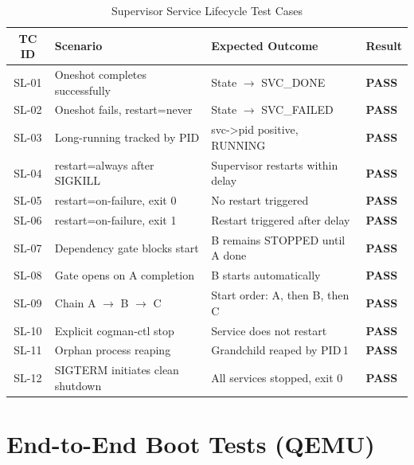 \documentclass[12pt,a4paper]{report}
\begin{document}
\begin{table}[H]
\centering
\caption{Supervisor Service Lifecycle Test Cases}
\renewcommand{\arraystretch}{1.2}
\begin{tabularx}{\linewidth}{c X X >{\centering\arraybackslash}p{1.2cm}}
\toprule
\textbf{TC ID} & \textbf{Scenario} & \textbf{Expected Outcome} & \textbf{Result}\\
\midrule
SL-01 & Oneshot completes successfully      & State $\to$ SVC\_DONE                 & \textbf{PASS}\\
SL-02 & Oneshot fails, restart=never        & State $\to$ SVC\_FAILED               & \textbf{PASS}\\
SL-03 & Long-running tracked by PID         & svc->pid positive, RUNNING            & \textbf{PASS}\\
SL-04 & restart=always after SIGKILL        & Supervisor restarts within delay      & \textbf{PASS}\\
SL-05 & restart=on-failure, exit 0          & No restart triggered                  & \textbf{PASS}\\
SL-06 & restart=on-failure, exit 1          & Restart triggered after delay         & \textbf{PASS}\\
SL-07 & Dependency gate blocks start        & B remains STOPPED until A done        & \textbf{PASS}\\
SL-08 & Gate opens on A completion          & B starts automatically                & \textbf{PASS}\\
SL-09 & Chain A $\to$ B $\to$ C    & Start order: A, then B, then C        & \textbf{PASS}\\
SL-10 & Explicit cogman-ctl stop            & Service does not restart              & \textbf{PASS}\\
SL-11 & Orphan process reaping              & Grandchild reaped by PID\,1           & \textbf{PASS}\\
SL-12 & SIGTERM initiates clean shutdown    & All services stopped, exit 0          & \textbf{PASS}\\
\bottomrule
\end{tabularx}
\end{table}

\FloatBarrier
\section{End-to-End Boot Tests (QEMU)}
\end{document}

